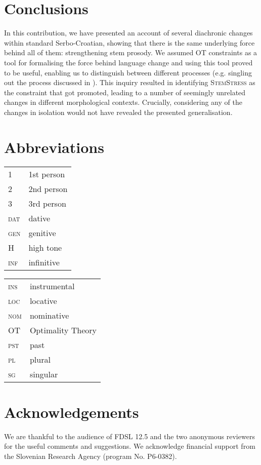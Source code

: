 \documentclass[output=paper,modfonts,nonflat
]{langsci/langscibook}
\begin{document}
\section{Conclusions} \label{sec:kager:6}

In this contribution, we have presented an account of several diachronic changes within standard Serbo-Croatian, showing that there is the same underlying force behind all of them: strengthening stem prosody. We assumed OT constraints as a tool for formalising the force behind language change and using this tool proved to be useful, enabling us to distinguish between different processes (e.g. singling out the process discussed in  ). This inquiry resulted in identifying \textsc{StemStress} as the constraint that got promoted, leading to a number of seemingly unrelated changes in different morphological contexts. Crucially, considering any of the changes in isolation would not have revealed the presented generalisation.

\section*{Abbreviations}

\begin{tabularx}{.45\textwidth}{lX}
\textsc{1}&1st person\\
\textsc{2}&2nd person\\
\textsc{3}&3rd person\\
\textsc{dat}&dative\\
\textsc{gen}&genitive\\
H&high tone\\
\textsc{inf}&infinitive\\
\end{tabularx}
\begin{tabularx}{.45\textwidth}{lX}
\textsc{ins}&instrumental\\
\textsc{loc}&locative\\
\textsc{nom}&nominative\\
OT&Optimality Theory\\
\textsc{\textsc{pst}}&past\\
\textsc{pl}&plural\\
\textsc{sg}&singular\\
\end{tabularx}

\section*{Acknowledgements}

We are thankful to the audience of FDSL 12.5 and the two anonymous reviewers for the useful comments and suggestions. We acknowledge financial support from the Slovenian Research Agency (program No. P6-0382).


\sloppy
\printbibliography[heading=subbibliography,notkeyword=this]
\end{document}
